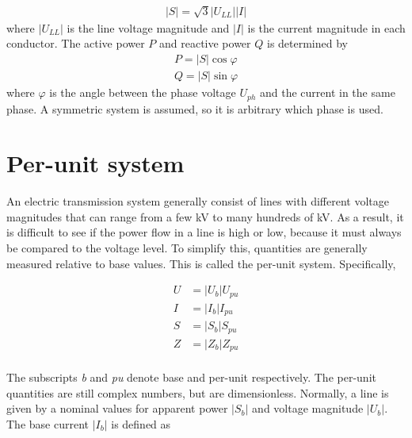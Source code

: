 \documentclass[class=book, crop=false]{standalone}
\begin{document}
\begin{equation}
   \begin{aligned}\label{eq:theory:three_phase_power}
|S| = \sqrt{3}|U_{LL}||I| 
\end{aligned} 
\end{equation}
where $|U_{LL}|$ is the line voltage magnitude and $|I|$ is the current magnitude in each conductor. The active power $P$ and reactive power $Q$ is determined by 
\begin{equation}
   \begin{aligned}\label{eq:theory:three_phase_reactive}
P = |S|\cos{\varphi} \\
Q = |S|\sin{\varphi} 
\end{aligned} 
\end{equation}
where $\varphi$ is the angle between the phase voltage $U_{ph}$ and the current in the same phase. A symmetric system is assumed, so it is arbitrary which phase is used. 




\section{Per-unit system}
An electric transmission system generally consist of lines with different voltage magnitudes that can range from a few kV to many hundreds of kV. As a result, it is difficult to see if the power flow in a line is high or low, because it must always be compared to the voltage level. To simplify this, quantities are generally measured relative to base values. This is called the per-unit system. Specifically,


\begin{equation}
   \begin{aligned}\label{eq:theory:per_unit_all}
U &= |U_{b}|U_{pu} \\
I &= |I_{b}|I_{pu} \\
S &= |S_{b}|S_{pu} \\
Z &= |Z_{b}|Z_{pu} \\
\end{aligned} 
\end{equation}

The subscripts \textit{b} and \textit{pu} denote base and per-unit respectively. The per-unit quantities are still complex numbers, but are dimensionless. Normally, a line is given by a nominal values for apparent power $|S_{b}|$ and voltage magnitude $|U_{b}|$. The base current $|I_{b}|$ is defined as 
\end{document}
